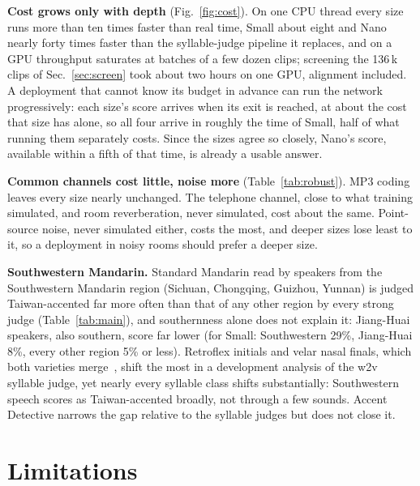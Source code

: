 \documentclass{Interspeech}
\begin{document}
\textbf{Cost grows only with depth} (Fig.~\ref{fig:cost}). On one CPU thread every size runs more than ten times faster than real time, Small about eight and Nano nearly forty times faster than the syllable-judge pipeline it replaces, and on a GPU throughput saturates at batches of a few dozen clips; screening the 136\,k clips of Sec.~\ref{sec:screen} took about two hours on one GPU, alignment included. A deployment that cannot know its budget in advance can run the network progressively: each size's score arrives when its exit is reached, at about the cost that size has alone, so all four arrive in roughly the time of Small, half of what running them separately costs. Since the sizes agree so closely, Nano's score, available within a fifth of that time, is already a usable answer.

\textbf{Common channels cost little, noise more} (Table~\ref{tab:robust}). MP3 coding leaves every size nearly unchanged. The telephone channel, close to what training simulated, and room reverberation, never simulated, cost about the same. Point-source noise, never simulated either, costs the most, and deeper sizes lose least to it, so a deployment in noisy rooms should prefer a deeper size.

\textbf{Southwestern Mandarin.} Standard Mandarin read by speakers from the Southwestern Mandarin region (Sichuan, Chongqing, Guizhou, Yunnan) is judged Taiwan-accented far more often than that of any other region by every strong judge (Table~\ref{tab:main}), and southernness alone does not explain it: Jiang-Huai speakers, also southern, score far lower (for Small: Southwestern 29\%, Jiang-Huai 8\%, every other region 5\% or less). Retroflex initials and velar nasal finals, which both varieties merge~\cite{kubler1985influence,norman1988chinese}, shift the most in a development analysis of the w2v syllable judge, yet nearly every syllable class shifts substantially: Southwestern speech scores as Taiwan-accented broadly, not through a few sounds. Accent Detective narrows the gap relative to the syllable judges but does not close it.

\section{Limitations}
\label{sec:limits}
\end{document}

